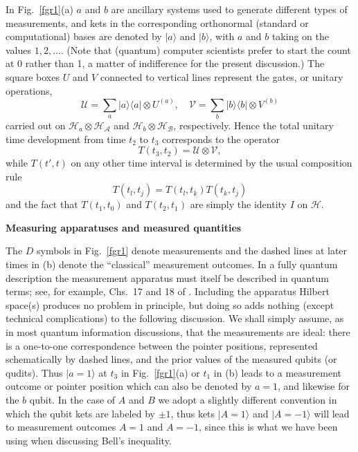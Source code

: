 \documentclass[10pt]{article} %
\def\outl#1{\par{\medskip\noindent\hspace*{.5cm}\bf
      \mathversion{bold}#1\mathversion{normal}\smallskip} }
\def\np{} \def\xa{} \def\xb{} \def\xn{} \def\xp{}
\def\outl#1{} \def\np{} \def\xa{} \def\xb{} \def\xn{} \def\xp{}
\def\outl#1{\par{\medskip\noindent\hspace*{.5cm}\bf
      \mathversion{bold}#1\mathversion{normal}\smallskip} }
\def\np{\newpage }\def\xn{\nopagebreak }\def\xp{\pagebreak }
\newcommand{\dya}[1]{|#1\rgl\lgl#1|}
\newcommand{\ket}[1]{|#1\rgl }
\newcommand{\lgl}{\langle }
\newcommand{\ot}{\otimes }
\newcommand{\rgl}{\rangle }
\newcommand{\AM}{{\mathcal A}}
\newcommand{\BM}{{\mathcal B}}
\newcommand{\HM}{{\mathcal H}}
\newcommand{\UM}{{\mathcal U}}
\newcommand{\VM}{{\mathcal V}}
\begin{document}
In Fig.~\ref{fgr1}(a) $a$ and $b$ are ancillary systems used to generate
different types of measurements, and kets in the corresponding orthonormal
(standard or computational) bases are denoted by $\ket{a}$ and $\ket{b}$, with
$a$ and $b$ taking on the values $1, 2,\ldots$. (Note that (quantum) computer
scientists prefer to start the count at 0 rather than 1, a matter of
indifference for the present discussion.) The square boxes $U$ and $V$
connected to vertical lines represent the gates, or unitary operations,
\begin{equation}
  \UM = \sum_a \dya{a}\ot U^{(a)},\quad 
 \VM = \sum_b \dya{b}\ot V^{(b)}
\label{eqn24}
\end{equation}
carried out on $\HM_a\ot\HM_\AM$ and $\HM_b\ot\HM_\BM$, respectively.  Hence
the total unitary time development from time $t_2$ to $t_3$ corresponds to the
operator
\begin{equation}
  T(t_3,t_2) = \UM\ot\VM,
\label{eqn25}
\end{equation}
while $T(t',t)$ on any other time interval is
determined by the usual composition rule
\begin{equation}
  T(t_l,t_j) = T(t_l,t_k)T(t_k,t_j)
\label{eqn26}
\end{equation}
and the fact that $T(t_1,t_0)$ and $T(t_2,t_1)$ are simply the identity $I$ on
$\HM$.

\xb
\outl{Measuring apparatuses and measured quantities}
\xa


The $D$ symbols in Fig.~\ref{fgr1} denote measurements and the dashed lines at
later times in (b) denote the ``classical'' measurement outcomes. In a fully
quantum description the measurement apparatus must itself be described in
quantum terms; see, for example, Chs.~17 and 18 of \cite{Grff02c}. Including
the apparatus Hilbert space(s) produces no problem in principle, but doing so
adds nothing (except technical complications) to the following discussion.  We
shall simply assume, as in most quantum information discussions, that the
measurements are ideal: there is a one-to-one correspondence between the
pointer positions, represented schematically by dashed lines, and the prior
values of the measured qubits (or qudits).  Thus $\ket{a=1}$ at $t_3$ in
Fig.~\ref{fgr1}(a) or $t_1$ in (b) leads to a measurement outcome or pointer
position which can also be denoted by $a=1$, and likewise for the $b$ qubit.
In the case of $A$ and $B$ we adopt a slightly different convention in which
the qubit kets are labeled by $\pm 1$, thus kets $\ket{A=1}$ and $\ket{A=-1}$
will lead to measurement outcomes $A=1$ and $A=-1$, since this is what we have
been using when discussing Bell's inequality.
\end{document}
